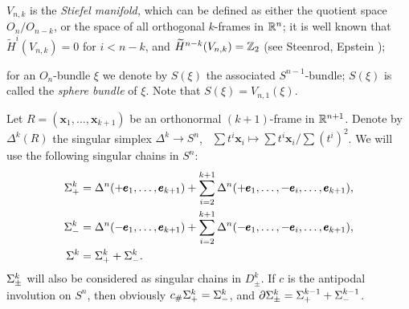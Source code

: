 \documentclass{article}
\begin{document}
$V_{n,k}$ is the {\it Stiefel manifold,\/} which can be defined
as either the quotient space $O_n/O_{n-k}$, or the space of all
orthogonal $k$-frames in $\mathbb R^n$; it is well known that
$\widetilde H^i(V_{n,k})=0$ for $i<n-k$,
and $\widetilde H^{n-k}(V_{n,k})=\mathbb Z_2$
(see Steenrod, Epstein \cite{7});

for an $O_n$-bundle $\xi$ we denote by $S(\xi)$ the associated
$S^{n-1}$-bundle; $S(\xi)$ is called the {\it sphere bundle\/} of $\xi$.
Note that $S(\xi)=V_{n,1}(\xi)$.

Let $R=({\pmb x}_1,\dots,{\pmb x}_{k+1})$ be an orthonormal
$(k+1)$-frame in $\mathbb R^{n+1}$. Denote by $\Delta^k(R)$ the singular
simplex $\Delta^k\to S^n$, \
$\sum t^i{\pmb x}_i\longmapsto\sum t^i{\pmb x}_i\big/\sum(t^i)^2$.
We will use the following singular chains in $S^n$:
\begin{align}
\Sigma_+^k&=\Delta^n(+{\pmb e}_1,\dots,{\pmb e}_{k+1})+
\sum_{i=2}^{k+1}\Delta^n(+{\pmb e}_1,\dots,-{\pmb e}_i,\dots,{\pmb e}_{k+1}),\\
\Sigma_-^k&=\Delta^n(-{\pmb e}_1,\dots,{\pmb e}_{k+1})+
\sum_{i=2}^{k+1}\Delta^n(-{\pmb e}_1,\dots,-{\pmb e}_i,\dots,{\pmb e}_{k+1}),\\
\Sigma^k&=\Sigma_+^k+\Sigma_-^k.
\end{align}
$\Sigma_{\pm}^k$ will also be considered as singular chains in $D_{\pm}^k$.
If $c$ is the antipodal involution on $S^n$, then obviously
$c_\#\Sigma_+^k=\Sigma_-^k$, and $\partial\Sigma_{\pm}^k=\Sigma_+^{k-1}+\Sigma_-^{k-1}$.
\end{document}

